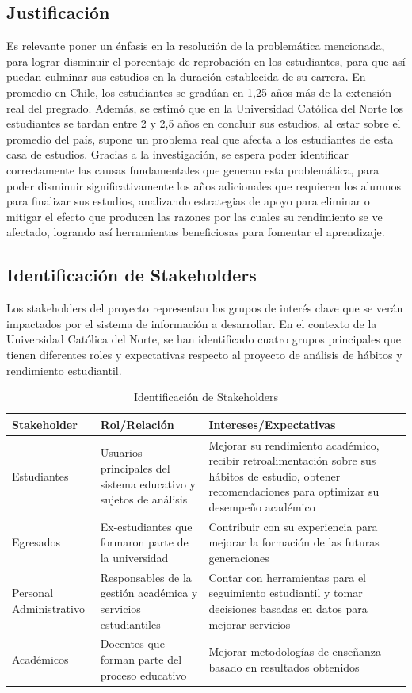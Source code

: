 \documentclass[12pt,letterpaper]{report}
\begin{document}
\subsection{Justificación}
Es relevante poner un énfasis en la resolución de la problemática mencionada, para lograr disminuir el porcentaje de reprobación en los estudiantes, para que así puedan culminar sus estudios en la duración establecida de su carrera. En promedio en Chile, los estudiantes se gradúan en 1,25 años más de la extensión real del pregrado. Además, se estimó que en la Universidad Católica del Norte los estudiantes se tardan entre 2 y 2,5 años en concluir sus estudios, al estar sobre el promedio del país, supone un problema real que afecta a los estudiantes de esta casa de estudios.
Gracias a la investigación, se espera poder identificar correctamente las causas fundamentales que generan esta problemática, para poder disminuir significativamente los años adicionales que requieren los alumnos para finalizar sus estudios, analizando estrategias de apoyo para eliminar o mitigar el efecto que producen las razones por las cuales su rendimiento se ve afectado, logrando así herramientas beneficiosas para fomentar el aprendizaje.

\subsection{Identificación de Stakeholders}
Los stakeholders del proyecto representan los grupos de interés clave que se verán impactados por el sistema de información a desarrollar. En el contexto de la Universidad Católica del Norte, se han identificado cuatro grupos principales que tienen diferentes roles y expectativas respecto al proyecto de análisis de hábitos y rendimiento estudiantil.

\begin{table}[H]
    \centering
    \begin{tabularx}{\textwidth}{|X|X|X|}
        \hline
        \textbf{Stakeholder} & \textbf{Rol/Relación} & \textbf{Intereses/Expectativas} \\
        \hline
        Estudiantes & Usuarios principales del sistema educativo y sujetos de análisis & Mejorar su rendimiento académico, recibir retroalimentación sobre sus hábitos de estudio, obtener recomendaciones para optimizar su desempeño académico \\
        \hline
        Egresados & Ex-estudiantes que formaron parte de la universidad & Contribuir con su experiencia para mejorar la formación de las futuras generaciones \\
        \hline
        Personal Administrativo & Responsables de la gestión académica y servicios estudiantiles & Contar con herramientas para el seguimiento estudiantil y tomar decisiones basadas en datos para mejorar servicios \\
        \hline
        Académicos & Docentes que forman parte del proceso educativo & Mejorar metodologías de enseñanza basado en resultados obtenidos \\
        \hline
    \end{tabularx}
    \caption{Identificación de Stakeholders}
\end{table}
\end{document}
